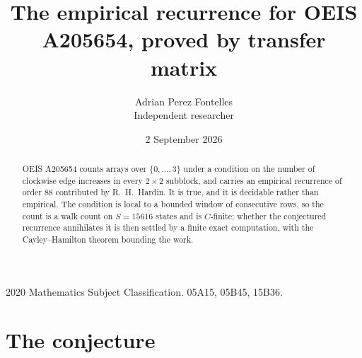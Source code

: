 \documentclass[11pt,a4paper]{article}
\title{The empirical recurrence for OEIS A205654, proved by transfer matrix}
\author{Adrian Perez Fontelles\\ \small Independent researcher}
\date{2 September 2026}
\theoremstyle{plain}
\theoremstyle{definition}
\begin{document}
\maketitle

\begin{abstract}
OEIS A205654 counts arrays over $\{0,\dots,3\}$ under a condition on the number of clockwise edge increases
in every $2\times2$ subblock, and carries an empirical recurrence of order $88$ contributed by
R.~H.~Hardin. It is true, and it is decidable rather than empirical. The condition is local to
a bounded window of consecutive rows, so the count is a walk count on $S=15616$ states and is
$C$-finite; whether the conjectured recurrence annihilates it is then settled by a finite exact
computation, with the Cayley--Hamilton theorem bounding the work.
\end{abstract}

\noindent\small 2020 Mathematics Subject Classification. 05A15, 05B45, 15B36.\normalsize

\section{The conjecture}
\end{document}
